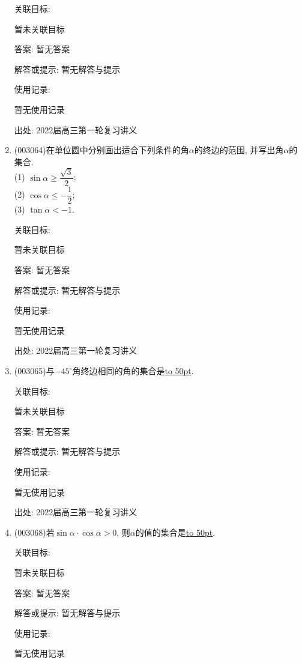 \documentclass[10pt,a4paper]{article}
\newcommand{\blank}[1]{\underline{\hbox to #1pt{}}}
\begin{document}
\begin{enumerate}[1.]
关联目标:

暂未关联目标

答案: 暂无答案

解答或提示: 暂无解答与提示

使用记录:

暂无使用记录


出处: 2022届高三第一轮复习讲义
\item { (003064)}在单位圆中分别画出适合下列条件的角$\alpha$的终边的范围, 并写出角$\alpha$的集合.\\
(1) $\sin\alpha\ge \dfrac{\sqrt 3}2$;\\
(2) $\cos\alpha\le -\dfrac 12$;\\
(3) $\tan\alpha<-1$.


关联目标:

暂未关联目标

答案: 暂无答案

解答或提示: 暂无解答与提示

使用记录:

暂无使用记录


出处: 2022届高三第一轮复习讲义
\item { (003065)}与$-45^\circ$角终边相同的角的集合是\blank{50}.


关联目标:

暂未关联目标

答案: 暂无答案

解答或提示: 暂无解答与提示

使用记录:

暂无使用记录


出处: 2022届高三第一轮复习讲义
\item { (003068)}若$\sin\alpha\cdot\cos\alpha>0$, 则$\alpha$的值的集合是\blank{50}.


关联目标:

暂未关联目标

答案: 暂无答案

解答或提示: 暂无解答与提示

使用记录:

暂无使用记录



\end{enumerate}
\end{document}
